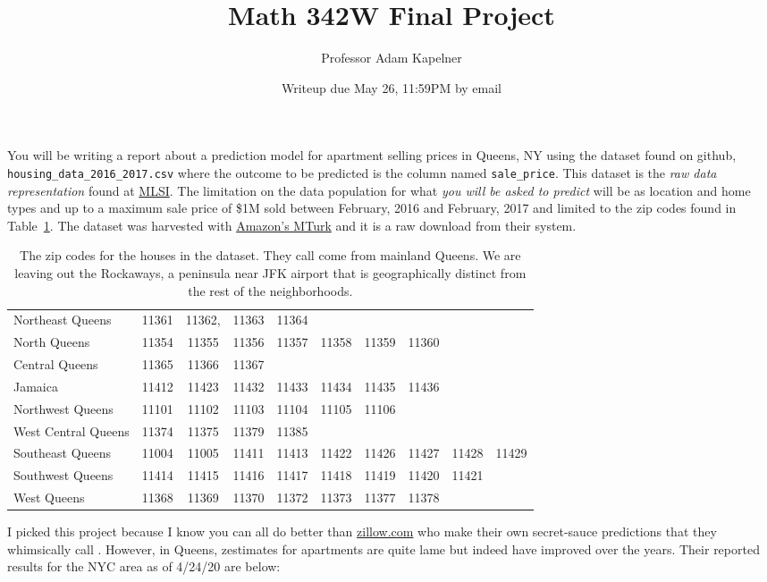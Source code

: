 \documentclass[12pt]{article}
\title{Math 342W Final Project \the\year}
\author{Professor Adam Kapelner}
\date{Writeup due May 26, 11:59PM by email}
\begin{document}
\maketitle

You will be writing a report about a prediction model for apartment selling prices in Queens, NY using the dataset found on github, \texttt{housing\_data\_2016\_2017.csv} where the outcome to be predicted is the column named \texttt{sale\_price}. This dataset is the \emph{raw data representation} found at \href{http://www.mlsli.com/}{MLSI}. The limitation on the data population for what \emph{you will be asked to predict} will be  as location and home types  and  up to a maximum sale price of \$1M sold between February, 2016 and February, 2017 and limited to the zip codes found in Table~\ref{tab:zips}. The dataset was harvested with \href{mturk.com}{Amazon's MTurk} and it is a raw download from their system.


\begin{table}[htp]
\centering\footnotesize
\begin{tabular}{l|ccccccccc}
\hline
Northeast Queens		&11361& 11362,& 11363& 11364 \\
North Queens		&11354& 11355& 11356& 11357& 11358& 11359& 11360 \\
Central Queens		&11365& 11366& 11367 \\
Jamaica				&11412& 11423& 11432& 11433& 11434& 11435& 11436 \\
Northwest Queens	&11101& 11102& 11103& 11104& 11105& 11106 \\
West Central Queens	&11374& 11375& 11379& 11385 \\
Southeast Queens		&11004& 11005& 11411& 11413& 11422& 11426& 11427& 11428& 11429 \\
Southwest Queens	&11414& 11415& 11416& 11417& 11418& 11419& 11420& 11421 \\
West Queens			&11368& 11369& 11370& 11372& 11373& 11377& 11378 \\\hline
\end{tabular}
\label{tab:zips}
\caption{The zip codes for the houses in the dataset. They call come from mainland Queens. We are leaving out the Rockaways, a peninsula near JFK airport that is geographically distinct from the rest of the neighborhoods.}
\end{table}

I picked this project because I know you can all do better than \url{zillow.com} who make their own secret-sauce predictions that they whimsically call . However, in Queens, zestimates for apartments are quite lame but indeed have improved over the years. Their reported results for the NYC area as of 4/24/20 are below:
\end{document}
